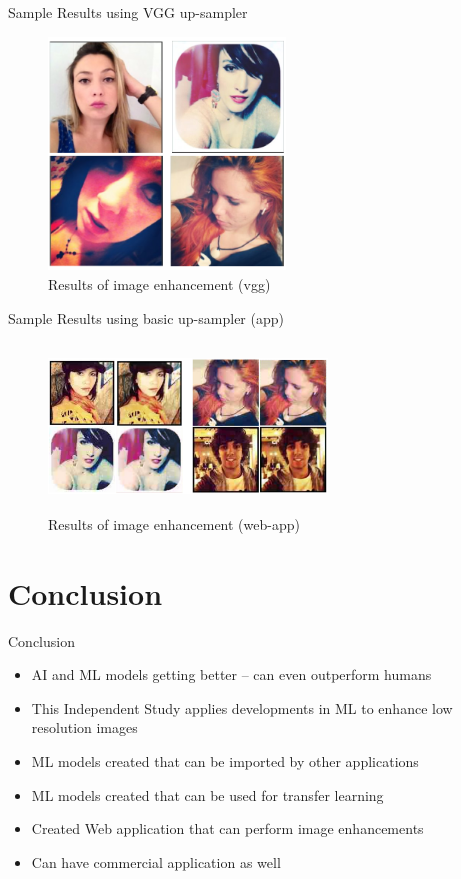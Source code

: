 \documentclass{beamer}
\begin{document}
	\begin{frame}{Sample Results using VGG up-sampler}
		\begin{figure}[htbp]
			\centerline{\includegraphics[width=17em]{res_vgg.png}}
			\caption{Results of image enhancement (vgg)}
			\label{res-fig}
		\end{figure}
	\end{frame}

	\begin{frame}{Sample Results using basic up-sampler (app)}
	\begin{figure}[htbp]
		\centerline{\includegraphics[height=12em, width=20em]{res_2.png}}
		\caption{Results of image enhancement (web-app)}
		\label{res2-fig}
	\end{figure}
\end{frame}


\section{Conclusion}
	\begin{frame}{Conclusion}
		\begin{itemize}
			\item AI and ML models getting better -- can even outperform humans
			\item This Independent Study applies developments in ML to enhance low resolution images
			\item ML models created that can be imported by other applications
			\item ML models created that can be used for transfer learning
			\item Created Web application that can perform image enhancements
			\item Can have commercial application as well
		\end{itemize}
	\end{frame}
\end{document}
